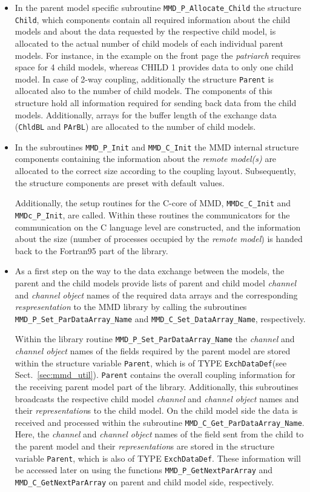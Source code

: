 \documentclass[twoside]{article}
\begin{document}
\begin{itemize}
\item
In the parent model specific subroutine \verb|MMD_P_Allocate_Child| the
 structure \verb|Child|, which components contain all required
information about the child models and about the data requested by
 the respective child model, is allocated
 to the actual number of child models of each individual parent models. 
For instance, in the example on the front page the {\it patriarch} requires
 space for 4 child models, whereas CHILD 1 provides data to only one
 child model. 
 In case of 2-way coupling, additionally the structure \verb|Parent|
 is allocated also to the number of child models. The components of this
 structure hold all information required for sending back data from the
 child models. 
 Additionally, arrays for the buffer length of the exchange data (\verb|ChldBL|
 and \verb|PArBL|) are allocated to the number of child models.
\item
In the subroutines \verb|MMD_P_Init| and \verb|MMD_C_Init| the MMD 
internal structure components containing the information about the
{\it remote model(s)} are 
allocated to the correct size according to the coupling
layout. Subsequently, the structure components are preset with
default values. 

Additionally, the setup routines for the C-core of MMD, \verb|MMDc_C_Init|
and \verb|MMDc_P_Init|, 
are called. Within these routines the communicators for the communication on
the C language level are constructed, and the information about the size (number
 of processes occupied by the {\it remote model}) is handed back to the 
Fortran95 part of the library.

\item
As a first step on the way to the data exchange between the models,
the parent and the child models 
provide lists of parent and child model {\it channel} and {\it channel object}
 names of the required data arrays and the corresponding {\it respresentation}
to the MMD library by calling the
subroutines \verb|MMD_P_Set_ParDataArray_Name|
and \verb|MMD_C_Set_DataArray_Name|, respectively.

Within the library routine \verb|MMD_P_Set_ParDataArray_Name| the {\it
channel} and {\it channel object} names of 
the fields required by the parent model are  
stored within the structure variable \verb|Parent|, which is of
TYPE \verb|ExchDataDef|(see Sect.\ \ref{sec:mmd_util}). \verb|Parent|
contains  the overall coupling information for the receiving parent model
part of the library. 
Additionally, this subroutines broadcasts the respective child model {\it
channel} and {\it channel object} names and their {\it
representation}s to the child model.  On the child model side the data is
received and processed within the
 subroutine \verb|MMD_C_Get_ParDataArray_Name|. Here, the 
{\it channel} and {\it channel object} names of the field sent
from the child to the parent model and their {\it representation}s
are stored in the structure variable \verb|Parent|, which is also of
TYPE \verb|ExchDataDef|.  
These information will be accessed later on using the functions
 \verb|MMD_P_GetNextParArray| and \verb|MMD_C_GetNextParArray|
 on parent and child model side, respectively.  


\end{itemize}
\end{document}
